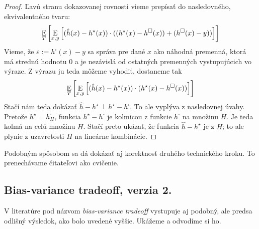 \begin{proof}
  Ľavú stranu dokazovanej rovnosti vieme prepísať do nasledovného,
  ekvivalentného tvaru:
  $$ \operatorname*{\mathrm{E}}_T \left[ \operatorname*{\mathrm{E}}_{x, y} \left[ (\hat{h}(x) - h^\star(x)) \cdot ((h^\star(x) - h^\square(x)) + (h^\square(x) - y)) \right] \right] $$
  Vieme, že $\varepsilon := h^\square(x) - y$ sa správa pre dané $x$
  ako náhodná premenná, ktorá má strednú hodnotu $0$ a je nezávislá
  od ostatných premenných vystupujúcich vo výraze. Z výrazu ju teda
  môžeme vyhodiť, dostaneme tak
  $$ \operatorname*{\mathrm{E}}_T \left[ \operatorname*{\mathrm{E}}_{x, y} \left[ (\hat{h}(x) - h^\star(x)) \cdot (h^\star(x) - h^\square(x)) \right] \right] $$
  Stačí nám teda dokázať $\hat{h} - h^\star \perp h^\star - h^\square$.
  To ale vyplýva z nasledovnej úvahy. Pretože $h^\star = h^\square_H$,
  funkcia $h^\star - h^\square$ je kolmicou z funkcie $h^\square$ na
  množinu $H$. Je teda kolmá na celú množinu $H$. Stačí preto ukázať,
  že funkcia $\hat{h} - h^\star$ je z $H$; to ale plynie z uzavretosti
  $H$ na lineárne kombinácie.
\end{proof}

Podobným spôsobom sa dá dokázať aj korektnosť druhého technického
kroku. To prenechávame čitateľovi ako cvičenie.
\fi


\subsection{Bias-variance tradeoff, verzia 2.}
V literatúre pod názvom \emph{bias-variance tradeoff} vystupuje aj
podobný, ale predsa odlišný výsledok, ako bolo uvedené vyššie.
Ukážeme a odvodíme si ho.

